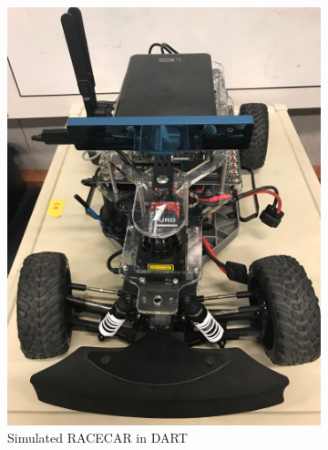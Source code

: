 \documentclass{article}
\begin{document}
\begin{figure}
 \begin{subfigure}[b]{0.49\textwidth}
   \includegraphics[width=1\linewidth]{figs/racecar.jpg}
   \caption{Simulated RACECAR in DART}
   \label{subfig:simcar}
 \end{subfigure}
 \hfill
 \begin{subfigure}[b]{0.49\textwidth}

\end{subfigure}
\end{figure}
\end{document}
